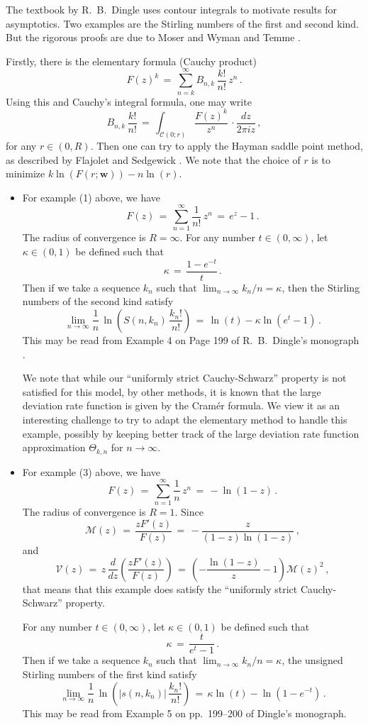 \documentclass[12pt]{article}
\begin{document}
The textbook by R.~B.~Dingle \cite{Dingle} uses contour integrals to motivate results for asymptotics.
Two examples are the Stirling numbers of the first and second kind.
But the rigorous proofs are due to Moser and Wyman \cite{MoserWyman1,MoserWyman2} and Temme \cite{Temme}.

Firstly, there is the elementary formula (Cauchy product)
$$
F(z)^k\, =\, \sum_{n=k}^{\infty} B_{n,k}\, \frac{k!}{n!}\, z^n\, .
$$
Using this and Cauchy's integral formula, one may write
$$
B_{n,k}\, \frac{k!}{n!}\, =\, \int_{\mathcal{C}(0;r)} \frac{F(z)^k}{z^n}\, \cdot \frac{dz}{2\pi i z}\, ,
$$
for any $r \in (0,R)$. Then one can try to apply the Hayman saddle point method,
as described by Flajolet and Sedgewick \cite{FlajoletSedgewick}.
We note that the choice of $r$ is to minimize $k \ln(F(r;\boldsymbol{w})) - n \ln(r)$.

\begin{itemize}
\item[(A)] For example (1) above, we have
$$
F(z)\, =\, \sum_{n=1}^{\infty} \frac{1}{n!}\, z^n\, =\, e^z-1\, .
$$
The radius of convergence is $R=\infty$.
For any number $t \in (0,\infty)$, let $\kappa \in (0,1)$ be defined such that
$$
\kappa\, =\, \frac{1-e^{-t}}{t}\, .
$$
Then if we take a sequence $k_n$ such that $\lim_{n \to \infty} k_n/n=\kappa$, then
the Stirling numbers of the second kind satisfy
$$
\lim_{n \to \infty} \frac{1}{n}\, \ln\left(S(n,k_n)\, \frac{k_n!}{n!}\right)\, =\, \ln(t) - \kappa \ln(e^{t}-1)\, .
$$
This may be read from Example 4 on Page 199 of R.~B.~Dingle's monograph \cite{Dingle}.

We note that while our ``uniformly strict Cauchy-Schwarz'' property is not satisfied for this model, by other methods, it is known
that the large deviation rate function is given by the Cram\'er formula.
We view it as an interesting challenge to try to adapt the elementary method to handle this example, possibly
by keeping better track of the large deviation rate function approximation $\Theta_{k,n}$ for $n \to \infty$.
\item[(B)] For example (3) above, we have
$$
F(z)\, =\, \sum_{n=1}^{\infty} \frac{1}{n}\, z^n\, =\, -\ln(1-z)\, .
$$
The radius of convergence is $R=1$.
Since
$$
\mathcal{M}(z)\, =\, \frac{z F'(z)}{F(z)}\, =\, -\frac{z}{(1-z)\ln(1-z)}\, ,
$$
and
$$
\mathcal{V}(z)\, =\, z\, \frac{d}{dz}\left(\frac{z F'(z)}{F(z)}\right)\,
=\, \left(-\frac{\ln(1-z)}{z}-1\right) \mathcal{M}(z)^2\, ,
$$
that means that this example does satisfy the ``uniformly strict Cauchy-Schwarz'' property.

For any number $t \in (0,\infty)$, let $\kappa \in (0,1)$ be defined such that
$$
\kappa\, =\, \frac{t}{e^t-1}\, .
$$
Then if we take a sequence $k_n$ such that $\lim_{n \to \infty} k_n/n=\kappa$, 
the unsigned Stirling numbers of the first kind satisfy
$$
\lim_{n \to \infty} \frac{1}{n}\, \ln\left(|s(n,k_n)|\, \frac{k_n!}{n!}\right)\, =\, \kappa \ln(t) - \ln(1-e^{-t})\, .
$$
This may be read from Example 5 on pp.~199--200 of Dingle's monograph.
\end{itemize}
\end{document}
